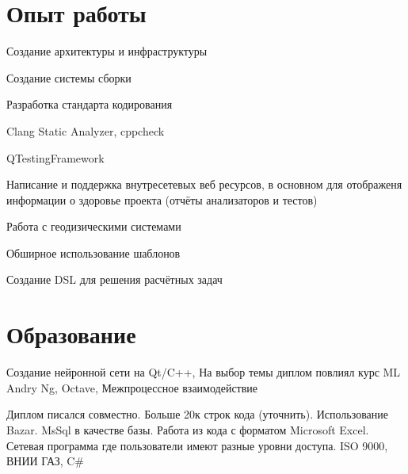 \documentclass[a4paper]{curricula-vitae}
\begin{document}
\begin{minipage}[t]{0.66\textwidth} %

\section{Опыт работы} 


\vspace{\topsep} %
\begin{tightitemize}
\item Создание архитектуры и инфраструктуры
\item Создание системы сборки
\item Разработка стандарта кодирования
\item Clang Static Analyzer, cppcheck
\item QTestingFramework
\item Написание и поддержка внутресетевых веб ресурсов, в основном для отображеня
информации о здоровье проекта (отчёты анализаторов и тестов)
\item Работа с геодизическими системами
\end{tightitemize}

\insertspace


\begin{tightitemize}
\item Обширное использование шаблонов
\item Создание DSL для решения расчётных задач
\end{tightitemize}

\insertspace

\section{Образование} 


Создание нейронной сети на Qt/C++, На выбор темы диплом повлиял курс ML Andry Ng, Octave,
Межпроцессное взаимодействие

\insertspace


Диплом писался совместно. Больше 20к строк кода (уточнить). Использование Bazar.
MsSql в качестве базы. Работа из кода с форматом Microsoft Excel.
Сетевая программа где пользователи имеют разные уровни доступа.
ISO 9000, ВНИИ ГАЗ, C\#

\insertspace

\end{minipage} %

\end{document}
